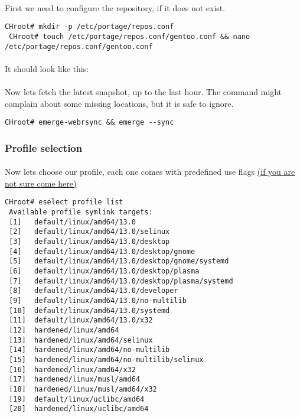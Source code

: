 \documentclass[10pt,a4paper]{article}
\begin{document}
                \paragraph{} First we need to configure the repository, if it does not exist.  

\begin{lstlisting}[style=BashInputCHRoot]
 CHroot# mkdir -p /etc/portage/repos.conf
 CHroot# touch /etc/portage/repos.conf/gentoo.conf && nano /etc/portage/repos.conf/gentoo.conf
\end{lstlisting}

                \paragraph{} It should look like this:
            

            
                \paragraph{} Now lets fetch the latest snapshot, up to the last hour. The command might complain about some missing locations, but it is safe to ignore.

\begin{lstlisting}[style=BashInputCHRoot]
 CHroot# emerge-webrsync && emerge --sync
\end{lstlisting}
               
           \newpage
           \subsubsection{Profile selection}
            
                \paragraph{} Now lets choose our profile, each one comes with predefined use flags \href{https://wiki.gentoo.org/wiki/Handbook:PPC/Working/USE}{(if you are not sure come here)}
            
\begin{lstlisting}[style=BashInputCHRoot]
 CHroot# eselect profile list
 Available profile symlink targets:
 [1]   default/linux/amd64/13.0
 [2]   default/linux/amd64/13.0/selinux
 [3]   default/linux/amd64/13.0/desktop
 [4]   default/linux/amd64/13.0/desktop/gnome
 [5]   default/linux/amd64/13.0/desktop/gnome/systemd
 [6]   default/linux/amd64/13.0/desktop/plasma
 [7]   default/linux/amd64/13.0/desktop/plasma/systemd
 [8]   default/linux/amd64/13.0/developer
 [9]   default/linux/amd64/13.0/no-multilib
 [10]  default/linux/amd64/13.0/systemd
 [11]  default/linux/amd64/13.0/x32
 [12]  hardened/linux/amd64
 [13]  hardened/linux/amd64/selinux
 [14]  hardened/linux/amd64/no-multilib
 [15]  hardened/linux/amd64/no-multilib/selinux
 [16]  hardened/linux/amd64/x32
 [17]  hardened/linux/musl/amd64
 [18]  hardened/linux/musl/amd64/x32
 [19]  default/linux/uclibc/amd64
 [20]  hardened/linux/uclibc/amd64
\end{lstlisting}
        
\end{document}
